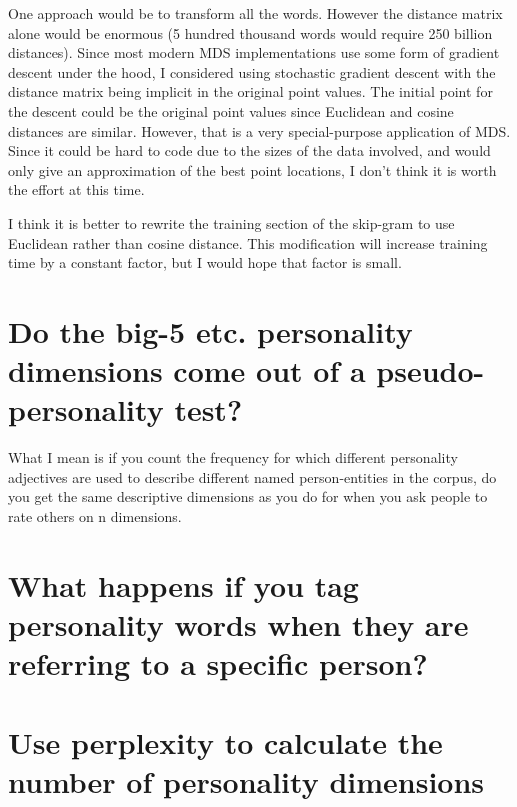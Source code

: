 \documentclass[eric_thesis.tex]{subfiles}
\begin{document}
One approach would be to transform all the words. However the distance matrix alone would be enormous (5 hundred thousand words would require 250 billion distances). Since most modern MDS implementations use some form of gradient descent under the hood, I considered using stochastic gradient descent with the distance matrix being implicit in the original point values. The initial point for the descent could be the original point values since Euclidean and cosine distances are similar. However, that is a very special-purpose application of MDS. Since it could be hard to code due to the sizes of the data involved, and would only give an approximation of the best point locations, I don't think it is worth the effort at this time.

I think it is better to rewrite the training section of the skip-gram to use Euclidean rather than cosine distance. This modification will increase training time by a constant factor, but I would hope that factor is small.

\section{Do the big-5 etc. personality dimensions come out of a pseudo-personality test?}
What I mean is if you count the frequency for which different personality adjectives are used to describe different named person-entities in the corpus, do you get the same descriptive dimensions as you do for when you ask people to rate others on n dimensions.

\section{What happens if you tag personality words when they are referring to a specific person?}

\section{Use perplexity to calculate the number of personality dimensions}
\end{document}

